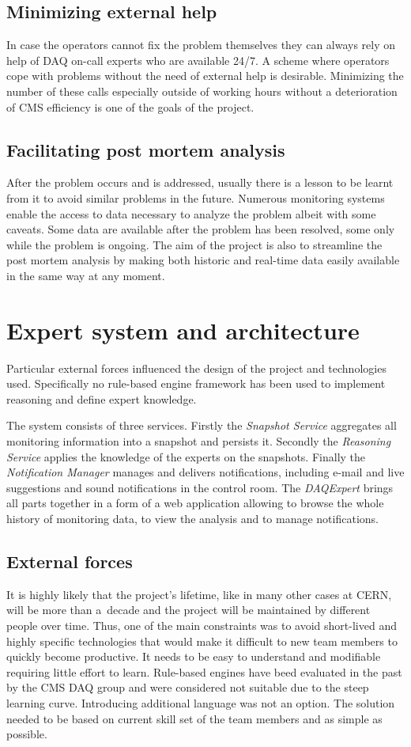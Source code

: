 \documentclass[a4paper]{jpconf}
\begin{document}
\subsection{Minimizing external help}
In case the operators cannot fix the problem themselves they can always rely on help of DAQ on-call experts who are available 24/7. A scheme where operators cope with problems without the need of external help is desirable. Minimizing the number of these calls especially outside of working hours without a deterioration of CMS efficiency is one of the goals of the project.


\subsection{Facilitating post mortem analysis}
After the problem occurs and is addressed, usually there is a lesson to be learnt from it to avoid similar problems in the future. Numerous monitoring systems enable the access to data necessary to analyze the problem albeit with some caveats. Some data are available after the problem has been resolved, some only while the problem is ongoing. The aim of the project is also to streamline the post mortem analysis by making both historic and real-time data easily available in the same way at any moment.

\section{Expert system and architecture}
Particular external forces influenced the design of the project and technologies used. Specifically no rule-based engine framework has been used to implement reasoning and define expert knowledge.

The system consists of three services. Firstly the {\it Snapshot Service} aggregates all monitoring information into a snapshot and persists it. Secondly the { \it Reasoning Service} applies the knowledge of the experts on the snapshots. Finally the { \it Notification Manager } manages and delivers notifications, including e-mail and live suggestions and sound notifications in the control room. The { \it DAQExpert } brings all parts together in a form of a web application allowing to browse the whole history of monitoring data, to view the analysis and to manage notifications.

\subsection{External forces}
It is highly likely that the project's lifetime, like in many other cases at CERN, will be more than a~decade and the project will be maintained by different people over time. Thus, one of the main constraints was to avoid short-lived and highly specific technologies that would make it difficult to new team members to quickly become productive. It needs to be easy to understand and modifiable requiring little effort to learn. Rule-based engines have beed evaluated in the past by the CMS DAQ group and were considered not suitable due to the steep learning curve. Introducing additional language was not an option. The solution needed to be based on current skill set of the team members and as simple as possible.
\end{document}
